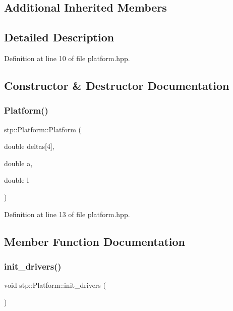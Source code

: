 \subsection*{Additional Inherited Members}


\subsection{Detailed Description}


Definition at line 10 of file platform.\+hpp.



\subsection{Constructor \& Destructor Documentation}
\mbox{\label{classstp_1_1_platform_ae1c608918b3d7c2bb95cddaff580233a}} 
\subsubsection{\texorpdfstring{Platform()}{Platform()}}
{\footnotesize\ttfamily stp\+::\+Platform\+::\+Platform (\begin{DoxyParamCaption}\item[{double}]{deltas\mbox{[}4\mbox{]},  }\item[{double}]{a,  }\item[{double}]{l }\end{DoxyParamCaption})\hspace{0.3cm}{\ttfamily [inline]}}



Definition at line 13 of file platform.\+hpp.



\subsection{Member Function Documentation}
\mbox{\label{classstp_1_1_platform_a29151c99e9b53ff150f802a27c9c3eaa}} 
\subsubsection{\texorpdfstring{init\+\_\+drivers()}{init\_drivers()}}
{\footnotesize\ttfamily void stp\+::\+Platform\+::init\+\_\+drivers (\begin{DoxyParamCaption}{ }\end{DoxyParamCaption})\hspace{0.3cm}{\ttfamily [inline]}}



